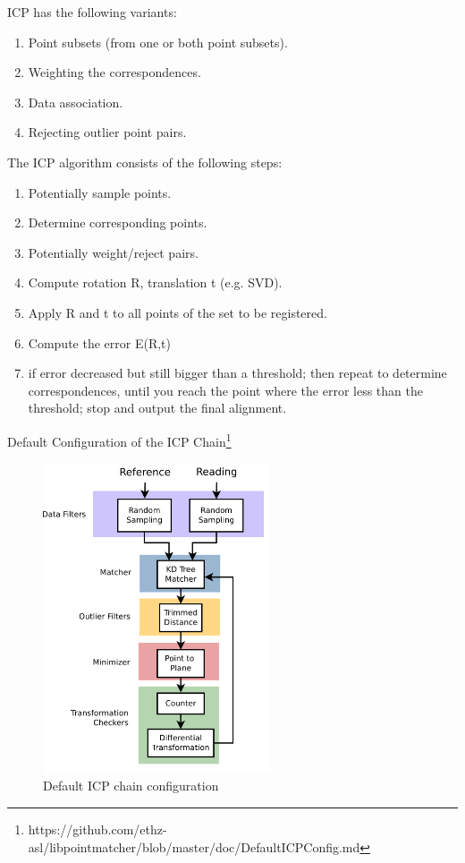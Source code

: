 \documentclass[a4paper,12pt]{article}
\begin{document}
ICP has the following variants:
\begin{enumerate}
    \item Point subsets (from one or both point subsets).
    \item Weighting the correspondences.
    \item Data association.
    \item Rejecting outlier point pairs.
\end{enumerate}
The ICP algorithm consists of the following steps:
\begin{enumerate}
    \item Potentially sample points.
    \item Determine corresponding points.
    \item Potentially weight/reject pairs.
    \item Compute rotation R, translation t (e.g. SVD).
    \item Apply R and t to all points of the set to be registered.
    \item Compute the error E(R,t)
    \item if error decreased but still bigger than a threshold; then repeat to determine correspondences, until you reach the point where the error less than the threshold; stop and output the final alignment.
\end{enumerate}
\newpage
Default Configuration of the ICP Chain\footnote{https://github.com/ethz-asl/libpointmatcher/blob/master/doc/DefaultICPConfig.md}
\begin{figure}[H]
\centering
\includegraphics[width=0.6\textwidth]{img/icp_chain.png}
\caption{Default ICP chain configuration}
\label{fig:icp}
\end{figure}
\end{document}
